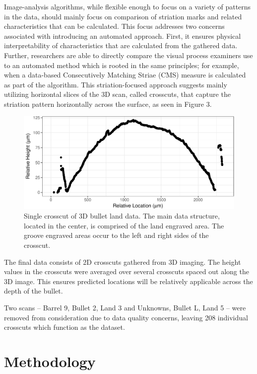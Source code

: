 \documentclass[]{article}
\begin{document}
Image-analysis algorithms, while flexible enough to focus on a variety
of patterns in the data, should mainly focus on comparison of striation
marks and related characteristics that can be calculated. This focus
addresses two concerns associated with introducing an automated
approach. First, it ensures physical interpretability of characteristics
that are calculated from the gathered data. Further, researchers are
able to directly compare the visual process examiners use to an
automated method which is rooted in the same principles; for example,
when a data-based Consecutively Matching Striae (CMS) \citep{Biasotti}
measure is calculated as part of the algorithm. This striation-focused
approach suggests mainly utilizing horizontal slices of the 3D scan,
called crosscuts, that capture the striation pattern horizontally across
the surface, as seen in Figure 3.

\begin{figure}
\centering
\includegraphics{writeup_files/figure-latex/unnamed-chunk-2-1.pdf}
\caption{Single crosscut of 3D bullet land data. The main data
structure, located in the center, is comprised of the land engraved
area. The groove engraved areas occur to the left and right sides of the
crosscut.}
\end{figure}

The final data consists of 2D crosscuts gathered from 3D imaging. The
height values in the crosscuts were averaged over several crosscuts
spaced out along the 3D image. This ensures predicted locations will be
relatively applicable across the depth of the bullet.

Two scans -- Barrel 9, Bullet 2, Land 3 and Unknowns, Bullet L, Land 5
-- were removed from consideration due to data quality concerns, leaving
208 individual crosscuts which function as the dataset.

\section{Methodology}
\end{document}
